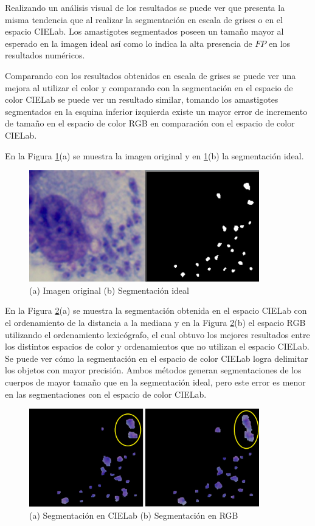 Realizando un análisis visual de los resultados se puede ver que presenta la misma tendencia que al realizar la segmentación en escala de grises o en el espacio CIELab. Los amastigotes segmentados poseen un tamaño mayor al esperado en la imagen ideal así como lo indica la alta presencia de $FP$ en los resultados numéricos.

Comparando con los resultados obtenidos en escala de grises se puede ver una mejora al utilizar el color y comparando con la segmentación en el espacio de color CIELab se puede ver un resultado similar, tomando los amastigotes segmentados en la esquina inferior izquierda existe un mayor error de incremento de tamaño en el espacio de color RGB en comparación con el espacio de color CIELab.


En la Figura \ref{img:r1}(a) se muestra la imagen original y en \ref{img:r1}(b) la segmentación ideal.

\begin{figure}[H]
\centering
\includegraphics[width=100mm]{./imagenes/r1.png}
\caption{(a) Imagen original (b) Segmentación ideal}
\label{img:r1}
\end{figure}

En la Figura \ref{img:r2}(a) se muestra la segmentación obtenida en el espacio CIELab con el ordenamiento de la distancia a la mediana y en la Figura \ref{img:r2}(b) el espacio RGB utilizando el ordenamiento lexicógrafo, el cual obtuvo los mejores resultados entre los distintos espacios de color y ordenamientos que no utilizan el espacio CIELab. Se puede ver cómo la segmentación en el espacio de color CIELab logra delimitar los objetos con mayor precisión. Ambos métodos generan segmentaciones de los cuerpos de mayor tamaño que en la segmentación ideal, pero este error es menor en las segmentaciones con el espacio de color CIELab.

\begin{figure}[H]
\centering
\includegraphics[width=100mm]{./imagenes/r2.png}
\caption{(a) Segmentación en CIELab (b) Segmentación en RGB}
\label{img:r2}
\end{figure}
